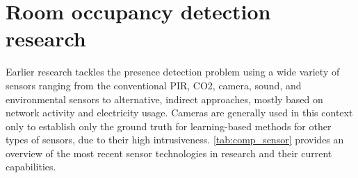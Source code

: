\section{Room occupancy detection research}

Earlier research tackles the presence detection problem using a wide variety of sensors ranging from the conventional PIR, CO2, camera, sound, and environmental sensors to alternative, indirect approaches, mostly based on network activity and electricity usage. Cameras are generally used in this context only to establish only the ground truth for learning-based methods for other types of sensors, due to their high intrusiveness. \autoref{tab:comp_sensor} provides an overview of the most recent sensor technologies in research and their current capabilities. 


